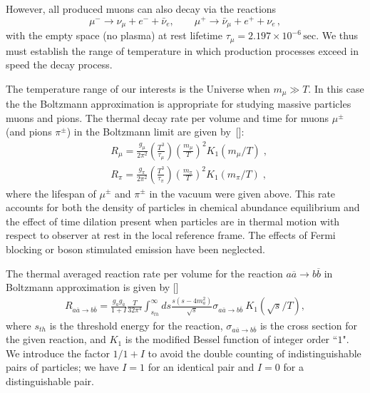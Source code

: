 However, all produced muons can also decay via the reactions
\begin{equation}
\mu^-\rightarrow\nu_\mu+e^-+\bar{\nu}_e,\qquad \mu^+\rightarrow\bar{\nu}_\mu+e^++\nu_e\,,
\end{equation} 
with the empty space (no plasma) at rest lifetime $\tau_{\mu}=2.197 \times 10^{-6}\,\mathrm{sec}$. We thus must establish the range of temperature in which production processes exceed in speed the decay process.
 
 The temperature range of our interests is the Universe when $m_\mu\gg T$. In this case the the Boltzmann approximation is appropriate for studying massive particles muons and pions. The thermal decay rate per volume and time  for muons $\mu^\pm$ (and pions $\pi^\pm$) in the Boltzmann limit  are given by~[\cite{PhysRevC.82.035203}]:
\begin{align}
&R_\mu=\frac{g_\mu}{2\pi^2}\left(\frac{T^3}{\tau_\mu}\right)\left(\frac{m_\mu}{T}\right)^2K_1(m_\mu/T)\;,\\
&R_\pi=\frac{g_\pi}{2\pi^2}\left(\frac{T^3}{\tau_\pi}\right)\left(\frac{m_\pi}{T}\right)^2K_1(m_\pi/T)\;, 
\end{align}
where the lifespan of $\mu^\pm$ and $\pi^\pm$ in the vacuum were given above. This rate accounts for both the density of particles in chemical abundance equilibrium and the effect of time dilation present when particles are in thermal motion with respect to observer at rest in the local reference frame. The effects of Fermi blocking or boson stimulated emission have been neglected.

The thermal averaged reaction rate per volume for the reaction $a\overline{a}\rightarrow b\overline{b}$ in Boltzmann approximation is given by [\cite{Letessier:2002ony}]
\begin{align}\label{pairR}
R_{a\overline{a}\rightarrow b\overline{b}}=\frac{g_ag_{\overline{a}}}{1+I}\frac{T}{32\pi^4}\int_{s_{th}}^\infty ds\frac{s(s-4m^2_a)}{\sqrt{s}}\sigma_{a\overline{a}\rightarrow b\overline{b}}~K_1(\sqrt{s}/T),
\end{align}
where $s_{th}$ is the threshold energy for the reaction, $\sigma_{a\overline{a}\rightarrow b\overline{b}}$ is the cross section for the given reaction, and $K_1$ is the modified
Bessel function of integer order ``$1$". We introduce the factor $1/1+I$ to avoid the double counting of indistinguishable pairs of particles; we have $I=1$ for an identical pair and $I=0$ for a distinguishable pair.

